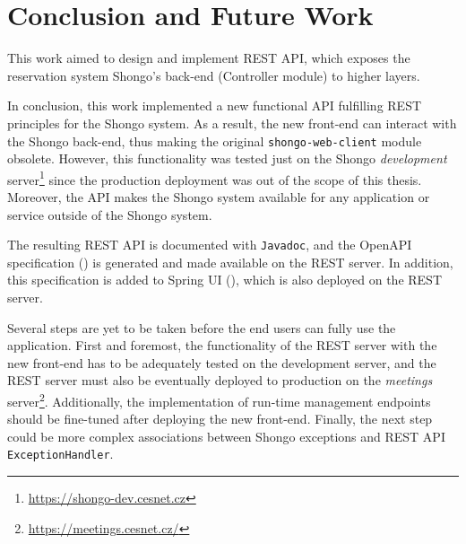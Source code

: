 \chapter{Conclusion and Future Work} \label{cha:conclusion}
This work aimed to design and implement REST API, which exposes the reservation system Shongo's back-end (Controller module) to higher layers.

In conclusion, this work implemented a new functional API fulfilling REST principles for the Shongo system.
As a result, the new front-end \cite{drobnakm} can interact with the Shongo back-end, thus making the original \texttt{shongo-web-client} module obsolete. However, this functionality was tested just on the Shongo \emph{development} server\footnote{\url{https://shongo-dev.cesnet.cz}} since the production deployment was out of the scope of this thesis.
Moreover, the API makes the Shongo system available for any application or service outside of the Shongo system.

The resulting REST API is documented with \texttt{Javadoc}, and the OpenAPI specification () is generated and made available on the REST server.
In addition, this specification is added to Spring UI (), which is also deployed on the REST server.

Several steps are yet to be taken before the end users can fully use the application.
First and foremost, the functionality of the REST server with the new front-end has to be adequately tested on the development server, and the REST server must also be eventually deployed to production on the \emph{meetings} server\footnote{\url{https://meetings.cesnet.cz/}}.
Additionally, the implementation of run-time management endpoints should be fine-tuned after deploying the new front-end.
Finally, the next step could be more complex associations between Shongo exceptions and REST API \texttt{ExceptionHandler}.
